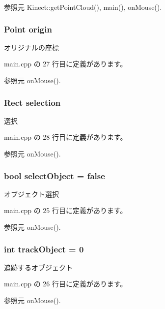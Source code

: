 参照元 Kinect\-::get\-Point\-Cloud(), main(), on\-Mouse().

\subsubsection[{origin}]{\setlength{\rightskip}{0pt plus 5cm}Point origin}\label{main_8cpp_a903d0d8820c696aaa1170c50deb3633f}


オリジナルの座標 



 main.\-cpp の 27 行目に定義があります。



参照元 on\-Mouse().

\subsubsection[{selection}]{\setlength{\rightskip}{0pt plus 5cm}Rect selection}\label{main_8cpp_a15633c47538e3790df1e008a7f6dbfea}


選択 



 main.\-cpp の 28 行目に定義があります。



参照元 on\-Mouse().

\subsubsection[{select\-Object}]{\setlength{\rightskip}{0pt plus 5cm}bool select\-Object = false}\label{main_8cpp_a71a276a0dc4ef6aa35740b58f10bcb39}


オブジェクト選択 



 main.\-cpp の 25 行目に定義があります。



参照元 on\-Mouse().

\subsubsection[{track\-Object}]{\setlength{\rightskip}{0pt plus 5cm}int track\-Object = 0}\label{main_8cpp_a88f176e4e65e22a17093a8cd24003a66}


追跡するオブジェクト 



 main.\-cpp の 26 行目に定義があります。



参照元 on\-Mouse().

